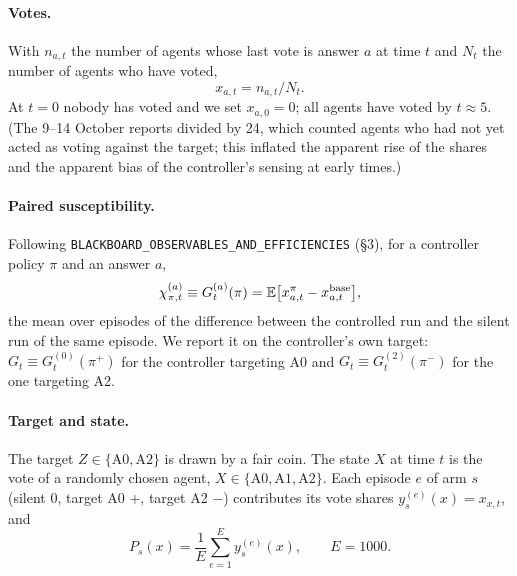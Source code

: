 \documentclass[10pt,a4paper]{article}
\begin{document}
\paragraph{Votes.} With $n_{a,t}$ the number of agents whose last vote is answer $a$ at time $t$ and $N_t$ the
number of agents who have voted,
\begin{equation}\label{eq:share}
x_{a,t} = n_{a,t}/N_t .
\end{equation}
At $t = 0$ nobody has voted and we set $x_{a,0} = 0$; all agents have voted by $t \approx 5$. (The 9--14 October reports divided by 24, which counted agents who had
not yet acted as voting against the target; this inflated the apparent rise of the shares and the apparent bias of
the controller's sensing at early times.)

\paragraph{Paired susceptibility.} Following \texttt{BLACKBOARD\_OBSERVABLES\_AND\_EFFICIENCIES} (\S3), for a
controller policy $\pi$ and an answer $a$,
\begin{equation}\label{eq:chi}
\chi^{(a)}_{\pi,t} \equiv G^{(a)}_t(\pi) = \mathbb E\bigl[x^{\pi}_{a,t} - x^{\rm base}_{a,t}\bigr],
\end{equation}
the mean over episodes of the difference between the controlled run and the silent run of the same episode. We
report it on the controller's own target: $G_t \equiv G^{(0)}_t(\pi^{+})$ for the controller targeting A0 and
$G_t \equiv G^{(2)}_t(\pi^{-})$ for the one targeting A2.

\paragraph{Target and state.} The target $Z \in \{\text{A0}, \text{A2}\}$ is drawn by a fair coin. The state $X$
at time $t$ is the vote of a randomly chosen agent, $X \in \{\text{A0},\text{A1},\text{A2}\}$. Each episode $e$ of arm $s$
(silent 0, target A0 $+$, target A2 $-$) contributes its vote shares $y^{(e)}_s(x) = x_{x,t}$, and
\begin{equation}\label{eq:P}
P_s(x) = \frac1E\sum_{e=1}^{E} y^{(e)}_s(x), \qquad E = 1000 .
\end{equation}
\end{document}
